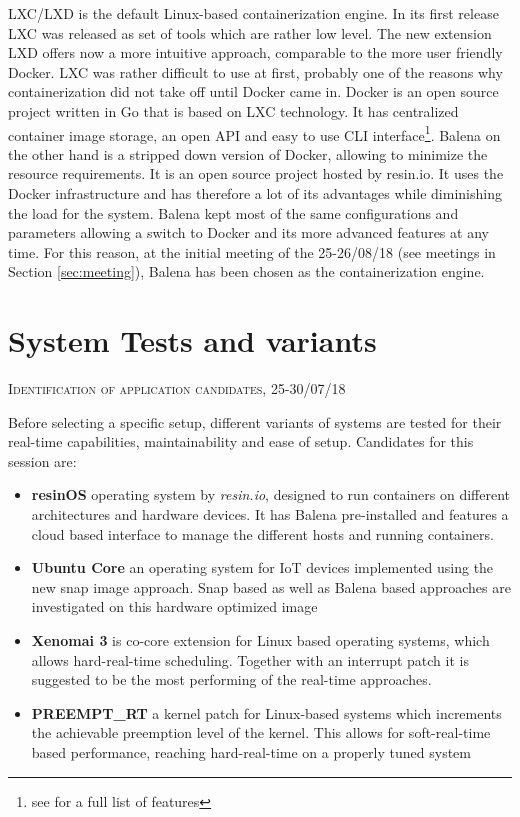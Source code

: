 \documentclass[]{scrartcl}
\begin{document}
LXC/LXD is the default Linux-based containerization engine. In its first release LXC was released as set of tools which are rather low level. The new extension LXD offers now a more intuitive approach, comparable to the more user friendly Docker. LXC was rather difficult to use at first, probably one of the reasons why containerization did not take off until Docker came in. Docker is an open source project written in Go that is based on LXC technology. It has centralized container image storage, an open API and easy to use CLI interface\footnote{see \cite{docker01} for a full list of features}. Balena on the other hand is a stripped down version of Docker, allowing to minimize the resource requirements. It is an open source project hosted by resin.io. It uses the Docker infrastructure and has therefore a lot of its advantages while diminishing the load for the system. Balena kept most of the same configurations and parameters allowing a switch to Docker and its more advanced features at any time. For this reason, at the initial meeting of the 25-26/08/18 (see meetings in Section \ref{sec:meeting}), Balena has been chosen as the containerization engine. 

\section{System Tests and variants}

{\small\textsc{Identification of application candidates, 25-30/07/18} \bigskip}

Before selecting a specific setup, different variants of systems are tested for their real-time capabilities, maintainability and ease of setup. Candidates for this session are:

\begin{itemize}
	\item \textbf{resinOS} operating system by \textit{resin.io}, designed to run containers on different architectures and hardware devices. It has Balena pre-installed and features a cloud based interface to manage the different hosts and running containers.
	\item \textbf{Ubuntu Core} an operating system for IoT devices implemented using the new snap image approach. Snap based as well as Balena based approaches are investigated on this hardware optimized image
	\item \textbf{Xenomai 3} is co-core extension for Linux based operating systems, which allows hard-real-time scheduling. Together with an interrupt patch it is suggested to be the most performing of the real-time approaches.
	\item \textbf{PREEMPT\_RT} a kernel patch for Linux-based systems which increments the achievable preemption level of the kernel. This allows for soft-real-time based performance, reaching hard-real-time on a properly tuned system
\end{itemize}
\end{document}
